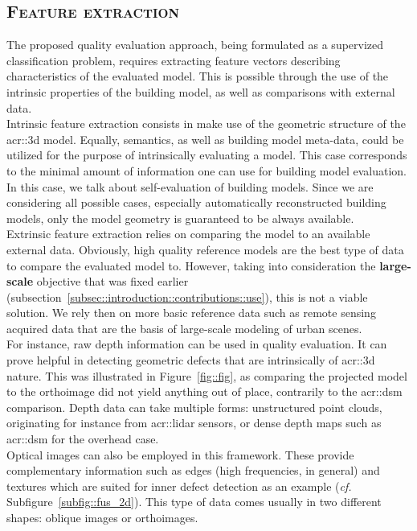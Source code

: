     \subsection{\textsc{Feature extraction}}
        \label{subsec::learned_evaluation::classification::feature_extraction}
        The proposed quality evaluation approach, being formulated as a supervized classification problem, requires extracting feature vectors describing characteristics of the evaluated model.
        This is possible through the use of the intrinsic properties of the building model, as well as comparisons with external data.\\
    
        Intrinsic feature extraction consists in make use of the geometric structure of the \gls{acr::3d} model.
        Equally, semantics, as well as building model meta-data, could be utilized for the purpose of intrinsically evaluating a model.
        This case corresponds to the minimal amount of information one can use for building model evaluation.
        In this case, we talk about self-evaluation of building models.
        Since we are considering all possible cases, especially automatically reconstructed building models, only the model geometry is guaranteed to be always available.\\
    
        Extrinsic feature extraction relies on comparing the model to an available external data.
        Obviously, high quality reference models are the best type of data to compare the evaluated model to.
        However, taking into consideration the \textbf{large-scale} objective that was fixed earlier (subsection~\ref{subsec::introduction::contributions::use}), this is not a viable solution.
        We rely then on more basic reference data such as remote sensing acquired data that are the basis of large-scale modeling of urban scenes.\\
        For instance, raw depth information can be used in quality evaluation.
        It can prove helpful in detecting geometric defects that are intrinsically of \gls{acr::3d} nature.
        This was illustrated in Figure~\ref{fig::fig}, as comparing the projected model to the orthoimage did not yield anything out of place, contrarily to the \gls{acr::dsm} comparison.
        Depth data can take multiple forms: unstructured point clouds, originating for instance from \gls{acr::lidar} sensors, or dense depth maps such as \gls{acr::dsm} for the overhead case.\\
        Optical images can also be employed in this framework.
        These provide complementary information such as edges (high frequencies, in general) and textures which are suited for inner defect detection as an example (\textit{cf.} Subfigure~\ref{subfig::fus_2d}).
        This type of data comes usually in two different shapes: oblique images or orthoimages.
    
